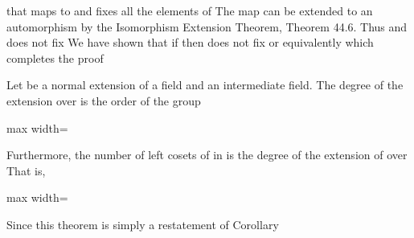 \documentclass[11pt,oneside]{article}
\begin{document}
\begin{BookBody}
\noindent that maps \BookInline{\alpha } to \BookInline{\beta } and fixes all the elements of  The map \BookInline{\psi _{\alpha,\allowbreak \beta }} can be extended to an automorphism  by the Isomorphism Extension Theorem, Theorem 44.6. Thus  and \BookInline{\sigma } does not fix  We have shown that if  then  does not fix \BookInline{\alpha;} or equivalently which completes the proof\BookEnd{\blacklozenge}

 Let  be a normal extension of a field  and  an intermediate field. The degree of the extension  over  is the order of the group 

\begin{center}\begin{adjustbox}{max width=\linewidth}\end{adjustbox}\end{center}

\noindent Furthermore, the number of left cosets of  in  is the degree of the extension of  over  That is,

\begin{center}\begin{adjustbox}{max width=\linewidth}\end{adjustbox}\end{center}

 Since  this theorem is simply a restatement of Corollary \BookEnd{\blacklozenge}

\end{BookBody}

\BookNarrativetrue
\end{document}
